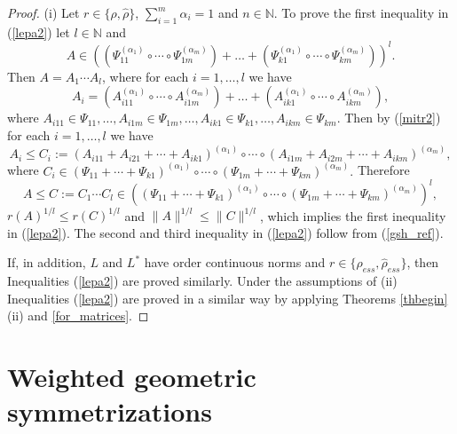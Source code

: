 \documentclass[12pt, reqno]{amsart}
\theoremstyle{definition}
\theoremstyle{remark}
\numberwithin{equation}{section}
\newcommand{\NN}{\mathbb{N}}
\begin{document}
\begin{proof} (i) Let  $r \in \{\rho, \hat{\rho}\}$, $\sum _{i=1} ^m \alpha _i = 1$ and $n \in \NN$. To prove the first inequality in (\ref{lepa2}) let $l\in \NN$ and 
$$A \in \left(\left(\Psi_{1 1}^{(\alpha _1)} \circ \cdots \circ \Psi_{1 m}^{(\alpha _m)}\right) +\ldots +\left(\Psi_{k 1}^{(\alpha _1)} \circ \cdots \circ \Psi_{k m}^{(\alpha _m)} \right)\right)^l.$$
Then $A=A_1 \cdots A_l$, where for each $i=1, \ldots , l$ we have
$$A_i = \left(A_{i1 1}^{(\alpha _1)} \circ \cdots \circ A_{i 1 m}^{(\alpha _m)}\right) +\ldots + \left(A_{i k 1}^{(\alpha _1)} \circ \cdots \circ A_{i k m}^{(\alpha _m)} \right),$$
where $A_{i1 1} \in \Psi_{1 1}, \ldots , A_{i1 m} \in \Psi_{1 m}, \ldots , A_{ik 1} \in \Psi_{k 1}, \ldots , A_{ikm} \in \Psi_{km}. $ 
Then by (\ref{mitr2}) for each $i=1, \ldots , l$ we have
$$A_i \le C_i := (A_{i11}+A_{i21}+ \cdots + A_{ik1} )^{(\alpha_1)} \circ \cdots \circ (A_{i1m}+A_{i2m}+ \cdots +A_{ikm} )^{(\alpha_m)}, $$
where $C_i \in (\Psi_{1 1} +\cdots  +\Psi_{k 1})^{(\alpha _1)} \circ \cdots
\circ (\Psi_{1 m} +\cdots +\Psi_{k m})^{(\alpha _m)}.$ Therefore 
$$A \le C:=C_1\cdots C_l  \in \left((\Psi_{1 1} +\cdots  +\Psi_{k 1})^{(\alpha _1)} \circ \cdots
\circ (\Psi_{1 m} + \cdots + \Psi_{k m})^{(\alpha _m)}\right)^l,$$
$r(A)^{1/l}\le r(C)^{1/l}$ and $\|A\|^{1/l}\le \|C\|^{1/l}$, which implies the first inequality in (\ref{lepa2}). The second and third inequality in (\ref{lepa2}) follow from  (\ref{gsh_ref}).

If, in addition, $L$ and $L^*$ have order continuous norms and $r\in \{ \rho _{ess}, \hat{\rho} _{ess}\}$, then Inequalities (\ref{lepa2}) are proved similarly. Under the assumptions of (ii) Inequalities (\ref{lepa2}) are proved in a similar way by applying Theorems \ref{thbegin}(ii) and \ref{for_matrices}.
\end{proof}

\section{Weighted geometric symmetrizations}
\end{document}
